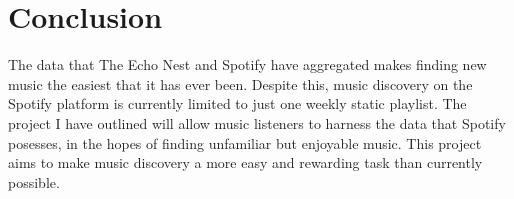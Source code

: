\section{Conclusion}
The data that The Echo Nest and Spotify have aggregated makes finding new music
the easiest that it has ever been. Despite this, music discovery on the Spotify
platform is currently limited to just one weekly static playlist. The project
I have outlined will allow music listeners to harness the data that Spotify posesses,
in the hopes of finding unfamiliar but enjoyable music. This project aims to make
music discovery a more easy and rewarding task than currently possible.
